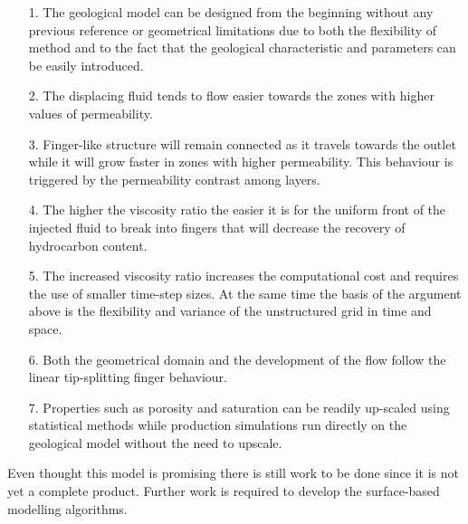\documentclass[preprint,authoryear,12pt]{elsarticle}
\begin{document}
\begin{enumerate}
\item[1.] The geological model can be designed from the beginning without any previous reference or geometrical limitations due to both the flexibility of method and to the fact that the geological characteristic and parameters can be easily introduced.

\item[2.] The displacing fluid tends to flow easier towards the zones with higher values of permeability.
\item[3.] Finger-like structure will remain connected as it travels towards the outlet while it will grow faster in zones with higher permeability. This behaviour is triggered by the permeability contrast among layers.
\item[4.] The higher the viscosity ratio the easier it is for the uniform front of the injected fluid to break into fingers that will decrease the recovery of hydrocarbon content.
\item[5.] The increased viscosity ratio increases the computational cost and requires the use of smaller time-step sizes. At the same time the basis of the argument above is the flexibility and variance of the unstructured grid in time and space.
\item[6.] Both the geometrical domain and the development of the flow follow the linear tip-splitting finger behaviour.
\item[7.] Properties such as porosity and saturation can be readily up-scaled using statistical methods while production simulations run directly on the geological model without the need to upscale.

\end{enumerate} 
  


\noindent Even thought this model is promising there is still work to be done since it is not yet a complete product. Further work is required to develop the surface-based modelling algorithms.
\end{document}
